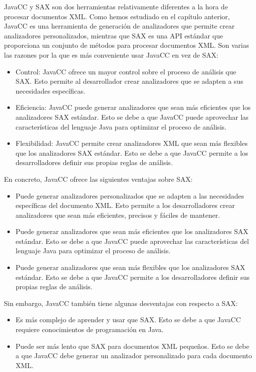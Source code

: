 \noindent JavaCC y SAX son dos herramientas relativamente diferentes a la hora de procesar documentos XML. Como hemos estudiado en el capítulo anterior, JavaCC es una herramienta de generación de analizadores que permite crear analizadores personalizados, mientras que SAX es una API estándar que proporciona un conjunto de métodos para procesar documentos XML.
Son varias las razones por la que es más conveniente usar JavaCC en vez de SAX:
\begin{itemize}
    \item Control: JavaCC ofrece un mayor control sobre el proceso de análisis que SAX. Esto permite al desarrollador crear analizadores que se adapten a sus necesidades específicas.
    \item Eficiencia: JavaCC puede generar analizadores que sean más eficientes que los analizadores SAX estándar. Esto se debe a que JavaCC puede aprovechar las características del lenguaje Java para optimizar el proceso de análisis.
    \item Flexibilidad: JavaCC permite crear analizadores XML que sean más flexibles que los analizadores SAX estándar. Esto se debe a que JavaCC permite a los desarrolladores definir sus propias reglas de análisis.
\end{itemize}
En concreto, JavaCC ofrece las siguientes ventajas sobre SAX:
\begin{itemize}
    \item Puede generar analizadores personalizados que se adapten a las necesidades específicas del documento XML. Esto permite a los desarrolladores crear analizadores que sean más eficientes, precisos y fáciles de mantener.
    \item Puede generar analizadores que sean más eficientes que los analizadores SAX estándar. Esto se debe a que JavaCC puede aprovechar las características del lenguaje Java para optimizar el proceso de análisis.
    \item Puede generar analizadores que sean más flexibles que los analizadores SAX estándar. Esto se debe a que JavaCC permite a los desarrolladores definir sus propias reglas de análisis.
\end{itemize}

Sin embargo, JavaCC también tiene algunas desventajas con respecto a SAX:
\begin{itemize}
    \item Es más complejo de aprender y usar que SAX. Esto se debe a que JavaCC requiere conocimientos de programación en Java.
    \item Puede ser más lento que SAX para documentos XML pequeños. Esto se debe a que JavaCC debe generar un analizador personalizado para cada documento XML.
\end{itemize}

